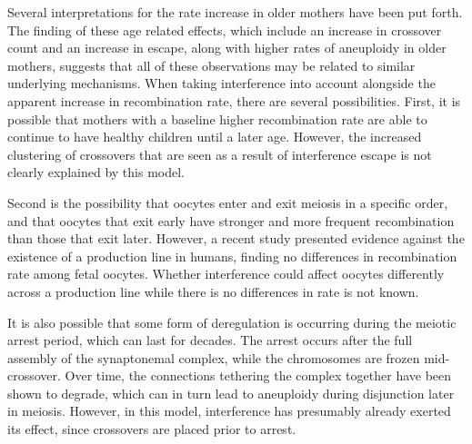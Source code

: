 Several interpretations for the rate increase in older mothers have been put forth.
The finding of these age related effects, which include an increase in crossover count and an increase in escape, along with higher rates of aneuploidy in older mothers\cite{Hassold2001}, suggests that all of these observations may be related to similar underlying mechanisms.
When taking interference into account alongside the apparent increase in recombination rate, there are several possibilities.
First, it is possible that mothers with a baseline higher recombination rate are able to continue to have healthy children until a later age\cite{Kong2004}.
However, the increased clustering of crossovers that are seen as a result of interference escape is not clearly explained by this model.

Second is the possibility that oocytes enter and exit meiosis in a specific order, and that oocytes that exit early have stronger and more frequent recombination than those that exit later.
However, a recent study presented evidence against the existence of a production line in humans, finding no differences in recombination rate among fetal oocytes\cite{Rowsey2014}.
Whether interference could affect oocytes differently across a production line while there is no differences in rate is not known.

It is also possible that some form of deregulation is occurring during the meiotic arrest period, which can last for decades.
The arrest occurs after the full assembly of the synaptonemal complex, while the chromosomes are frozen mid-crossover.
Over time, the connections tethering the complex together have been shown to degrade\cite{Nagaoka2012}, which can in turn lead to aneuploidy during disjunction later in meiosis.
However, in this model, interference has presumably already exerted its effect, since crossovers are placed prior to arrest.


